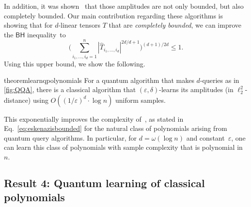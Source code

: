 \documentclass[11pt]{article}
\newcommand{\eps}{\varepsilon}
\newcommand{\BH}{\textsf{BH}}
\theoremstyle{plain}
\theoremstyle{plain}
\theoremstyle{definition}
\theoremstyle{remark}
\theoremstyle{named}
\begin{document}
In addition,  it was shown~\cite{QQA=CBF} that those amplitudes are not only bounded, but also completely bounded. 
Our main contribution regarding these algorithms is showing that for $d$-linear tensors $T$ that are \emph{completely bounded}, we can improve the $\BH$ inequality~to
$$
\Big(\sum_{i_1,\ldots,i_d=1}^n |\widehat T_{i_1,\ldots,i_d}|^{2d/d+1}\Big)^{(d+1)/2d}\leq 1.
$$ 
Using this upper bound, we show the following.
\begin{restatable}{theorem}{learnqpolynomials}\label{theo:learnqpolynomials}
    For a quantum algorithm that makes $d$-queries as in \cref{fig:QQA},  there is a classical algorithm that $(\eps,\delta)$-learns its amplitudes  (in $\ell_2^2$-distance) using  
    $
    O\left((1/\varepsilon)^d\cdot  \log n\right)
    $
    uniform samples.
\end{restatable}
This exponentially improves the complexity of~\cite{eskenazis2022learning}, as stated in Eq.~\eqref{eq:eskenazisbounded} for the natural class of  polynomials arising from quantum query algorithms. In particular, for $d=\omega(\log n)$ and constant~$\eps$, one can learn this class of polynomials with sample complexity that is polynomial in $n$.  


\subsection{Result 4: Quantum learning of classical polynomials}
\end{document}
